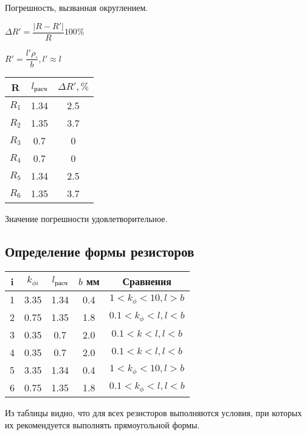 \documentclass[12pt, a4paper] {ncc}
\begin{document}
		Погрешность, вызванная округлением.
		\begin{center}
			$\Delta R' = \dfrac {\left| R - R'\right|} {R} 100 \%$

			$R' = \dfrac {l' \rho_{\square}} {b}, l' \approx l$
		\end{center}

		\begin{tabular}{|c|c|c|}
			\hline
			R   & $l_{\text{расч}}$ & $\Delta R', \%$ \\ \hline
		  $R_1$ & 1.34 & 2.5 \\ \hline
		  $R_2$ & 1.35 & 3.7 \\ \hline
		  $R_3$ & 0.7  & 0 \\ \hline
		  $R_4$ & 0.7  & 0 \\ \hline
		  $R_5$ & 1.34 & 2.5 \\ \hline
		  $R_6$ & 1.35 & 3.7 \\ \hline
		\end{tabular}

		Значение погрешности удовлетворительное.

	\subsection{Определение формы резисторов}
    	\begin{tabular}{|c|c|c|c|c|}
    		\hline
    		i & $k_{\phi i}$ & $l_{\text{расч}}$ & $b$ мм & Сравнения \\ \hline
    		1 &  3.35        & 1.34              &  0.4   & $1 < k_\phi < 10, l > b$   \\ \hline 
    		2 &  0.75        & 1.35              &  1.8   & $0.1 < k_\phi < l, l < b$  \\ \hline 
    		3 &  0.35        & 0.7               &  2.0   & $0.1 < k < l, l < b$ \\ \hline 
    		4 &  0.35        & 0.7               &  2.0   & $0.1 < k < l, l < b$ \\ \hline 
    		5 &  3.35        & 1.34              &  0.4   &  $1 < k_\phi < 10, l > b$   \\ \hline 
    		6 &  0.75        & 1.35              &  1.8   & $0.1 < k_\phi < l, l < b$  \\ \hline 
    	\end{tabular}

		Из таблицы видно, что для всех резисторов выполняются условия,
		при которых их рекомендуется выполнять прямоугольной формы.
\end{document}
